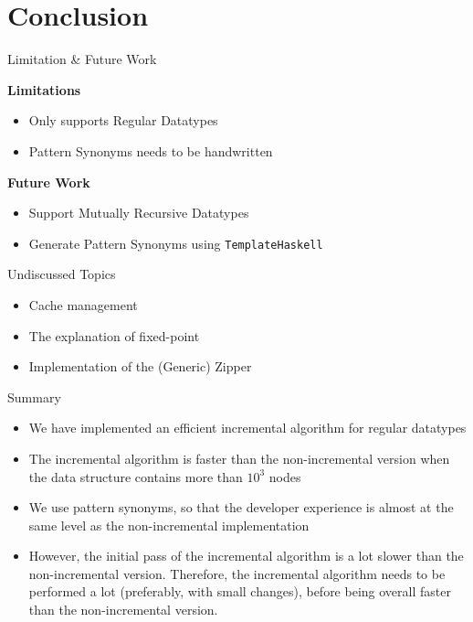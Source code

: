 \section{Conclusion}

\begin{slide}{Limitation \& Future Work}

\textbf{Limitations}

\begin{itemize}
  \item Only supports Regular Datatypes
  \item Pattern Synonyms needs to be handwritten
\end{itemize}  

\textbf{Future Work}

\begin{itemize}
  \item Support Mutually Recursive Datatypes
  \item Generate Pattern Synonyms using \texttt{TemplateHaskell}
\end{itemize}
\end{slide}

\begin{slide}{Undiscussed Topics}
\begin{itemize}
  \setlength\itemsep{.7em}
  \item Cache management
  \item The explanation of fixed-point
  \item Implementation of the (Generic) Zipper
\end{itemize}
\end{slide}

\begin{slide}{Summary}
\begin{itemize}
  \setlength\itemsep{1em}
  \item We have implemented an efficient incremental algorithm for regular datatypes
  \item The incremental algorithm is faster than the non-incremental version when the data structure contains more than $10^3$ nodes
  \item We use pattern synonyms, so that the developer experience is almost at the same level as the non-incremental implementation
  \item However, the initial pass of the incremental algorithm is a lot slower than the non-incremental version. Therefore, the incremental algorithm needs to be performed a lot (preferably, with small changes), before being overall faster than the non-incremental version.
\end{itemize}
\end{slide}